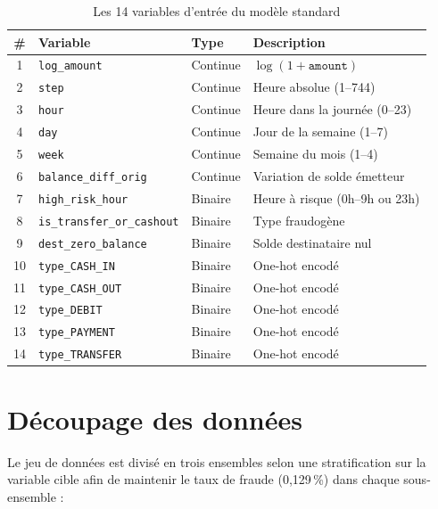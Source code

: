 \documentclass[12pt,a4paper,twoside]{report}
\theoremstyle{definition}
\begin{document}
\begin{table}[H]
\centering
\caption{Les 14 variables d'entrée du modèle standard}
\label{tab:features_14}
\renewcommand{\arraystretch}{1.3}
\begin{tabular}{clll}
\toprule
\textbf{\#} & \textbf{Variable} & \textbf{Type} & \textbf{Description} \\
\midrule
1  & \texttt{log\_amount}              & Continue  & $\log(1 + \texttt{amount})$ \\
2  & \texttt{step}                     & Continue  & Heure absolue (1--744) \\
3  & \texttt{hour}                     & Continue  & Heure dans la journée (0--23) \\
4  & \texttt{day}                      & Continue  & Jour de la semaine (1--7) \\
5  & \texttt{week}                     & Continue  & Semaine du mois (1--4) \\
6  & \texttt{balance\_diff\_orig}      & Continue  & Variation de solde émetteur \\
7  & \texttt{high\_risk\_hour}         & Binaire   & Heure à risque (0h--9h ou 23h) \\
8  & \texttt{is\_transfer\_or\_cashout} & Binaire  & Type fraudogène \\
9  & \texttt{dest\_zero\_balance}      & Binaire   & Solde destinataire nul \\
10 & \texttt{type\_CASH\_IN}           & Binaire   & One-hot encodé \\
11 & \texttt{type\_CASH\_OUT}          & Binaire   & One-hot encodé \\
12 & \texttt{type\_DEBIT}              & Binaire   & One-hot encodé \\
13 & \texttt{type\_PAYMENT}            & Binaire   & One-hot encodé \\
14 & \texttt{type\_TRANSFER}           & Binaire   & One-hot encodé \\
\bottomrule
\end{tabular}
\end{table}

\section{Découpage des données}

Le jeu de données est divisé en trois ensembles selon une stratification sur la
variable cible afin de maintenir le taux de fraude (0,129\,\%) dans chaque sous-ensemble :
\end{document}

